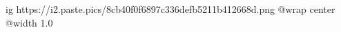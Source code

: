  
 
 
 
 

\ifcmt
	ig https://i2.paste.pics/8cb40f0f6897c336defb5211b412668d.png
  @wrap center
  @width 1.0
\fi

